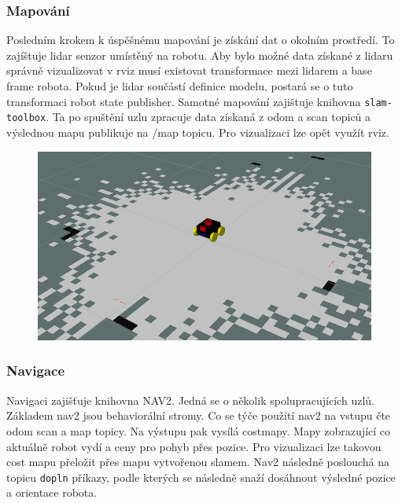 \subsubsection*{Mapování}
Posledním krokem k úspěšnému mapování je získání dat o okolním prostředí. To zajíštuje lidar senzor umístěný na robotu. Aby bylo možné data získané z lidaru správně vizualizovat v rviz musí existovat transformace mezi lidarem a base frame robota. Pokud je lidar součástí definice modelu, postará se o tuto transformaci robot state publisher. Samotné mapování zajištuje knihovna \verb|slam-toolbox|. Ta po spuštění uzlu zpracuje data získaná z odom a scan topiců a výslednou mapu publikuje na /map topicu. Pro vizualizaci lze opět využít rviz.

\begin{figure}[h!]
	\centering
	\includegraphics[scale=0.4]{obrazky-figures/slam.png}
	\caption{}
	\label{}
\end{figure}

\subsubsection*{Navigace}
Navigaci zajišťuje knihovna NAV2. Jedná se o několik spolupracujících uzlů. Základem nav2 jsou behaviorální stromy. Co se týče použití nav2 na vstupu čte odom scan a map topicy. Na výstupu pak vysílá costmapy. Mapy zobrazující co aktuálně robot vydí a ceny pro pohyb přes pozice. Pro vizualizaci lze takovou cost mapu přeložit přes mapu vytvořenou slamem. Nav2 následně poslouchá na topicu \verb|dopln| příkazy, podle kterých se následně snaží dosáhnout výsledné pozice a orientace robota. 

